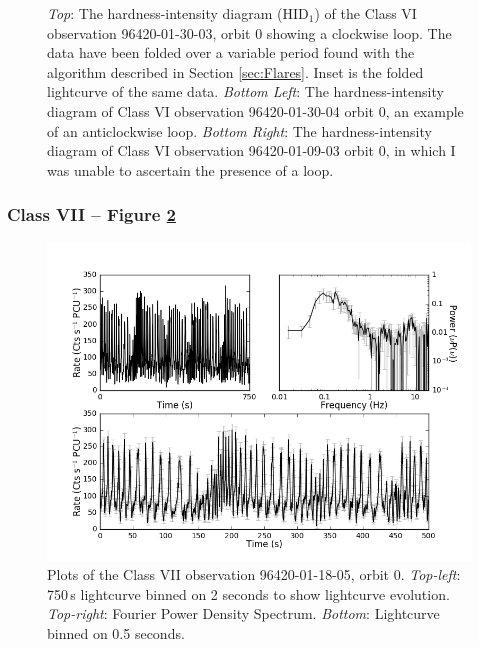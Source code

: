 \begin{figure}
    \captionsetup{singlelinecheck=off}
    \caption[The hardness-intensity diagram of the Class VI observation 96420-01-30-03, showing a clockwise loop.]{\textit{Top}: The hardness-intensity diagram (HID$_1$) of the Class VI observation 96420-01-30-03, orbit 0 showing a clockwise loop.  The data have been folded over a variable period found with the algorithm described in Section \ref{sec:Flares}.  Inset is the folded lightcurve of the same data. \textit{Bottom Left}: The hardness-intensity diagram of Class VI observation 96420-01-30-04 orbit 0, an example of an anticlockwise loop.  \textit{Bottom Right}: The hardness-intensity diagram of Class VI observation 96420-01-09-03 orbit 0, in which I was unable to ascertain the presence of a loop.}
   \label{fig:LoopVI}
\end{figure}

\subsubsection{Class VII -- Figure \ref{fig:Nmulti}}

\begin{figure}
    \includegraphics[width=0.8\columnwidth, trim = 0.6cm 0 3.9cm 0]{images/Nmulti.png}
    \captionsetup{singlelinecheck=off}
    \caption[Characteristic lightcurves and a power spectrum of Type VII variability.]{Plots of the Class VII observation 96420-01-18-05, orbit 0.  \textit{Top-left}: 750\,s lightcurve binned on 2 seconds to show lightcurve evolution.  \textit{Top-right}: Fourier Power Density Spectrum.  \textit{Bottom}: Lightcurve binned on 0.5 seconds.}
   \label{fig:Nmulti}
\end{figure}

